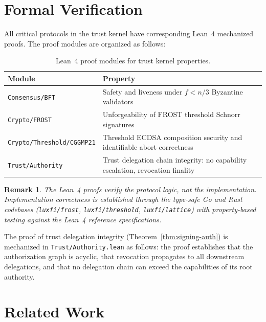 \documentclass[11pt,a4paper]{article}
\newtheorem{remark}{Remark}[section]
\begin{document}
\section{Formal Verification}\label{sec:verification}

All critical protocols in the trust kernel have corresponding Lean~4 mechanized
proofs. The proof modules are organized as follows:

\begin{table}[h]
\centering
\caption{Lean~4 proof modules for trust kernel properties.}
\label{tab:proofs}
\begin{tabular}{lp{7cm}}
\toprule
\textbf{Module} & \textbf{Property} \\
\midrule
\texttt{Consensus/BFT} & Safety and liveness under $f < n/3$ Byzantine
    validators \\
\texttt{Crypto/FROST} & Unforgeability of FROST threshold Schnorr
    signatures \\
\texttt{Crypto/Threshold/CGGMP21} & Threshold ECDSA composition security
    and identifiable abort correctness \\
\texttt{Trust/Authority} & Trust delegation chain integrity: no capability
    escalation, revocation finality \\
\bottomrule
\end{tabular}
\end{table}

\begin{remark}
The Lean~4 proofs verify the \emph{protocol logic}, not the implementation.
Implementation correctness is established through the type-safe Go and Rust
codebases (\texttt{luxfi/frost}, \texttt{luxfi/threshold}, \texttt{luxfi/lattice})
with property-based testing against the Lean~4 reference specifications.
\end{remark}

The proof of trust delegation integrity (Theorem~\ref{thm:signing-auth}) is
mechanized in \texttt{Trust/Authority.lean} as follows: the proof establishes
that the authorization graph is acyclic, that revocation propagates to all
downstream delegations, and that no delegation chain can exceed the
capabilities of its root authority.

\section{Related Work}\label{sec:related}
\end{document}
